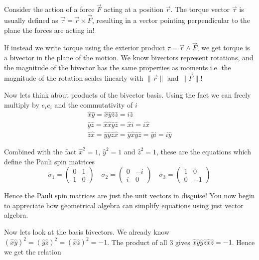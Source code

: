 \documentclass[options]{report}
\def \xhat{\hat{x}}
\def \yhat{\hat{y}}
\def \zhat{\hat{z}}
\newcommand{\norm}[1]{\lVert #1 \rVert}
\begin{document}
Consider the action of a force $\vec{F}$ acting at a position $\vec{r}$. The torque vector $\vec{\tau}$ is usually defined as $\vec{\tau} = \vec{r} \times \vec{F}$, resulting in a vector pointing perpendicular to the plane the forces are acting in!

If instead we write torque using the exterior product $\tau = \vec{r} \wedge \vec{F}$, we get torque is a bivector in the plane of the motion. We know bivectors represent rotations, and the magnitude of the bivector has the same properties as moments i.e. the magnitude of the rotation scales linearly with $\norm{\vec{r}}$ and $\norm{\vec{F}}$!

Now lets think about products of the bivector basis. Using the fact we can freely multiply by $e_i e_i$ and the commutativity of $i$
\begin{equation*}
	\begin{gathered}
		\xhat \yhat = \xhat \yhat \zhat \zhat = i \zhat \\
		\yhat \zhat = \xhat \xhat \yhat \zhat = \xhat i = i \xhat \\
		\zhat \xhat = \yhat \yhat \zhat \xhat = \yhat \xhat \yhat \zhat = \yhat i = i \yhat
	\end{gathered}
\end{equation*}

Combined with the fact $\xhat^2 = 1$, $\yhat^2 = 1$ and $\zhat^2 = 1$, these are the equations which define the Pauli spin matrices
\begin{equation*}
	\sigma_1 = \begin{pmatrix}
		0 & 1 \\ 1 & 0
	\end{pmatrix} \quad
	\sigma_2 = \begin{pmatrix}
		0 & -i \\ i & 0
	\end{pmatrix} \quad
	\sigma_3 = \begin{pmatrix}
		1 & 0 \\ 0 & -1
	\end{pmatrix}
\end{equation*}

Hence the Pauli spin matrices are just the unit vectors in disguise! You now begin to appreciate how geometrical algebra can simplify equations using just vector algebra.

Now lets look at the basis bivectors. We already know $(\xhat \yhat)^2 = (\yhat \zhat)^2 = (\xhat \zhat)^2 = -1$. The product of all 3 gives $\xhat \yhat \yhat \zhat \xhat \zhat = -1$. Hence we get the relation
\end{document}
